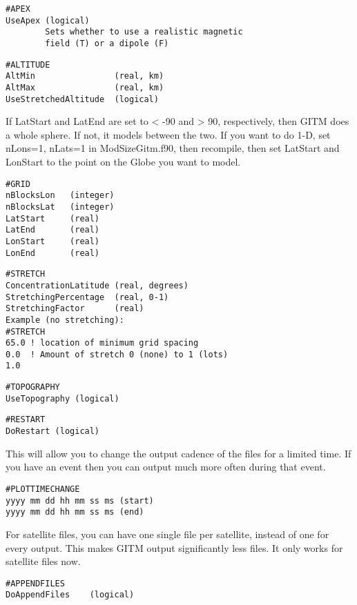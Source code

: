 \begin{verbatim}
#APEX
UseApex (logical)
        Sets whether to use a realistic magnetic
        field (T) or a dipole (F)
\end{verbatim}

\begin{verbatim}
#ALTITUDE
AltMin                (real, km)
AltMax                (real, km)
UseStretchedAltitude  (logical)
\end{verbatim}

If LatStart and LatEnd are set to < -90 and
> 90, respectively, then GITM does a whole
sphere.  If not, it models between the two.
If you want to do 1-D, set nLons=1, nLats=1 in
ModSizeGitm.f90, then recompile, then set LatStart
and LonStart to the point on the Globe you want
to model.
\begin{verbatim}
#GRID
nBlocksLon   (integer)
nBlocksLat   (integer)
LatStart     (real)
LatEnd       (real)
LonStart     (real)
LonEnd       (real)
\end{verbatim}

\begin{verbatim}
#STRETCH
ConcentrationLatitude (real, degrees)
StretchingPercentage  (real, 0-1)
StretchingFactor      (real)
Example (no stretching):
#STRETCH
65.0 ! location of minimum grid spacing
0.0	 ! Amount of stretch 0 (none) to 1 (lots)
1.0  
\end{verbatim}

\begin{verbatim}
#TOPOGRAPHY
UseTopography (logical)
\end{verbatim}

\begin{verbatim}
#RESTART
DoRestart (logical)
\end{verbatim}

This will allow you to change the output cadence
of the files for a limited time.  If you have an event
then you can output much more often during that event.
\begin{verbatim}
#PLOTTIMECHANGE
yyyy mm dd hh mm ss ms (start)
yyyy mm dd hh mm ss ms (end)
\end{verbatim}

For satellite files, you can have one single file
per satellite, instead of one for every output.
This makes GITM output significantly less files.
It only works for satellite files now.
\begin{verbatim}
#APPENDFILES
DoAppendFiles    (logical)
\end{verbatim}

